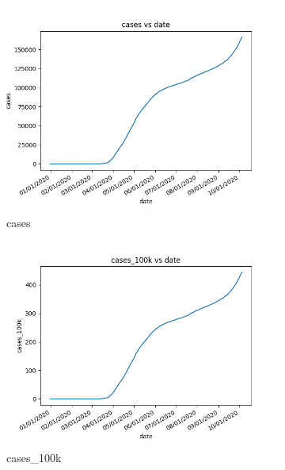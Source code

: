 \begin{figure}[h]
    \centering
    \begin{subfigure}[b]{0.24\linewidth}
        \includegraphics[width=\linewidth]{../figs/cases.png}
        \caption{cases}
    \end{subfigure}
    \begin{subfigure}[b]{0.24\linewidth}
        \includegraphics[width=\linewidth]{../figs/cases_100k.png}
        \caption{cases\_100k}
    \end{subfigure}
    \begin{subfigure}[b]{0.24\linewidth}

\end{subfigure}
\end{figure}
